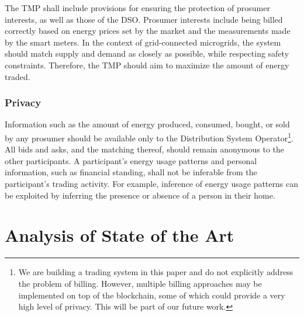 The TMP shall include provisions for ensuring the protection of prosumer interests, as well as those of the DSO. Prosumer interests include being billed correctly based on energy prices set by the market and the measurements made by the smart meters. In the context of grid-connected microgrids, the system should match supply and demand as closely as possible, while respecting safety constraints. Therefore, the TMP should  aim to maximize the amount of energy traded.



\subsubsection{Privacy}

Information such as the amount of energy produced, consumed, bought, or sold by any prosumer should be available only to the Distribution System Operator\footnote{We are building a trading system in this paper and do not explicitly address the problem of billing. However, multiple billing approaches may be implemented on top of the blockchain, some of which could provide a very high level of privacy. This will be part of our future work.}. All bids and asks, and the matching thereof, should remain anonymous to the other participants. A participant's energy usage patterns and personal information, such as financial standing, shall not be inferable from the participant's trading activity. For example, inference of energy usage patterns can be exploited by inferring the presence or absence of a person in their home.










\section{Analysis of State of the Art}
\label{sec:related}



